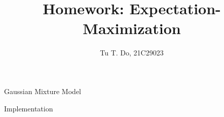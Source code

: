\documentclass{article}
\title{Homework: Expectation-Maximization}
\author{Tu T. Do, 21C29023}
\begin{document}
\maketitle

% 


\begin{section}{Gaussian Mixture Model}
    
\end{section}

\begin{section}{Implementation}
	
\end{section}
\end{document}
